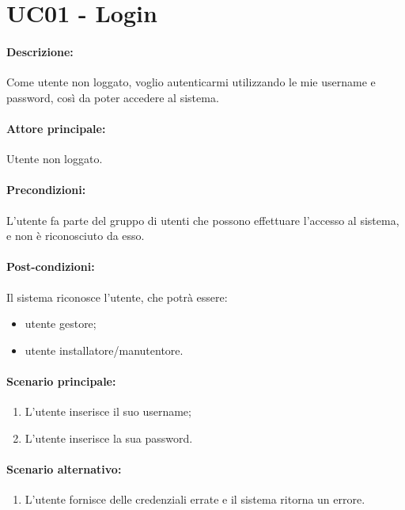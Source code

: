 \section{UC01 - Login}

\paragraph{Descrizione:}
Come utente non loggato, voglio autenticarmi utilizzando le mie username e password, così da poter accedere al sistema.

\paragraph{Attore principale:}
Utente non loggato.

\paragraph{Precondizioni:}
L'utente fa parte del gruppo di utenti che possono effettuare l'accesso al sistema, e non è riconosciuto da esso.

\paragraph{Post-condizioni:}
Il sistema riconosce l'utente, che potrà essere:
\begin{itemize}
    \item utente gestore;
    \item utente installatore/manutentore.
\end{itemize}

\paragraph{Scenario principale:}
\begin{enumerate}
    \item L'utente inserisce il suo username;
    \item L'utente inserisce la sua password.
\end{enumerate}

\paragraph{Scenario alternativo:}
\begin{enumerate}
    \item L'utente fornisce delle credenziali errate e il sistema ritorna un errore.
\end{enumerate}
